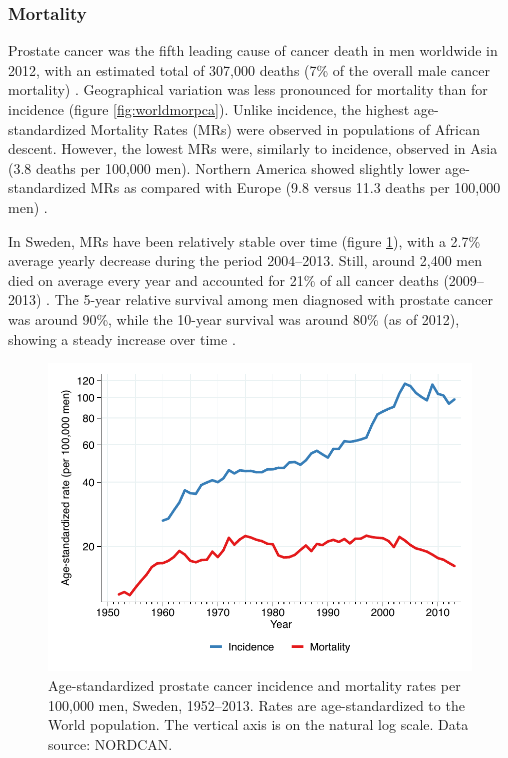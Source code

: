 \subsubsection{Mortality}
Prostate cancer was the fifth leading cause of cancer death in men worldwide in 2012, with an estimated total of 307,000 deaths (7\% of the overall male cancer mortality) \citep{ferlay_cancer_2015}. Geographical variation was less pronounced for mortality than for incidence (figure \ref{fig:worldmorpca}). Unlike incidence, the highest age-standardized Mortality Rates (MRs) were observed in populations of African descent. However, the lowest MRs were, similarly to incidence, observed in Asia (3.8 deaths per 100,000 men). Northern America showed slightly lower age-standardized MRs as compared with Europe (9.8 versus 11.3 deaths per 100,000 men) \citep{ferlay_cancer_2015}.

In Sweden, MRs have been relatively stable over time (figure \ref{fig:incmortsweden}), with a 2.7\% average yearly decrease during the period 2004--2013. Still, around 2,400 men died on average every year and accounted for 21\% of all cancer deaths (2009--2013) \citep{engholm_nordcan_2015}. The 5-year relative survival among men diagnosed with prostate cancer was around 90\%, while the 10-year survival was around 80\% (as of 2012), showing a steady increase over time \citep{socialstyrelsen_cancer_2013}. 

\begin{figure}
\begin{center}
\includegraphics[width=\linewidth]{figures/incmortsweden.pdf}
\end{center}
\caption[Age-standardized prostate cancer incidence and mortality rates per 100,000 men, Sweden, 1952--2013]{Age-standardized prostate cancer incidence and mortality rates per 100,000 men, Sweden, 1952--2013. Rates are age-standardized to the World population. The vertical axis is on the natural log scale. Data source: NORDCAN.}
\label{fig:incmortsweden}
\end{figure}

